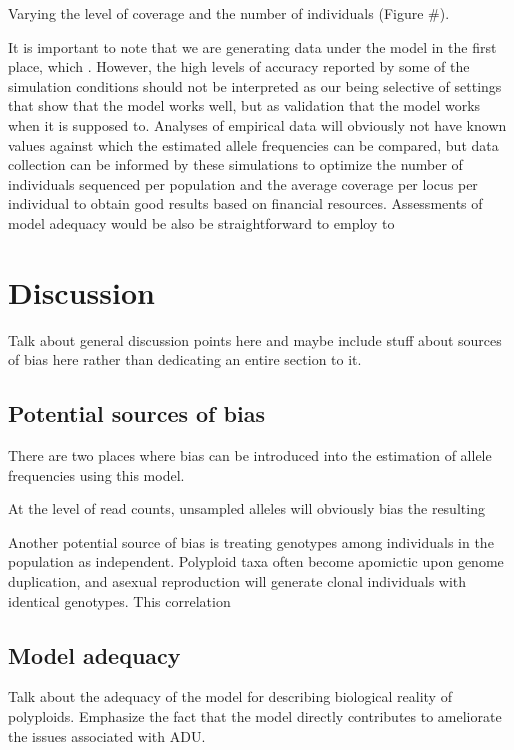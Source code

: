 \documentclass[11pt,english,letterpaper,oneside]{article}
\begin{document}
Varying the level of coverage and the number of individuals (Figure \#).
\medskip

It is important to note that we are generating data under the model in the first place, which . However, the high levels of accuracy reported by some of the simulation conditions should not be interpreted as our being selective of settings that show that the model works well, but as validation that the model works when it is supposed to. Analyses of empirical data will obviously not have known values against which the estimated allele frequencies can be compared, but data collection can be informed by these simulations to optimize the number of individuals sequenced per population and the average coverage per locus per individual to obtain good results based on financial resources. Assessments of model adequacy would be also be straightforward to employ to 
\medskip

\section*{Discussion}               %

Talk about general discussion points here and maybe include stuff about sources of bias here rather than dedicating an entire section to it.

\medskip
\subsection*{Potential sources of bias}
\medskip

There are two places where bias can be introduced into the estimation of allele frequencies using this model.
\medskip

At the level of read counts, unsampled alleles will obviously bias the resulting
\medskip

Another potential source of bias is treating genotypes among individuals in the population as independent. Polyploid taxa often become apomictic upon genome duplication, and asexual reproduction will generate clonal individuals with identical genotypes. This correlation 

\medskip
\subsection*{Model adequacy}
\medskip

Talk about the adequacy of the model for describing biological reality of polyploids. Emphasize the fact that the model directly contributes to ameliorate the issues associated with ADU.
\end{document}
